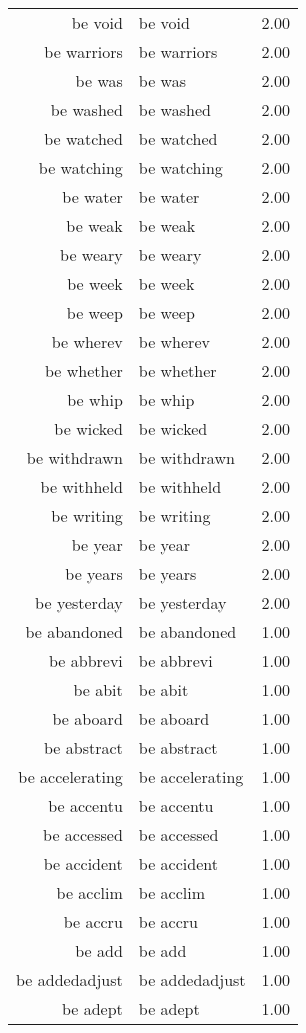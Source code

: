 \begin{table}[ht]
\begin{tabular}{rlr}
  be void & be void & 2.00 \\ 
  be warriors & be warriors & 2.00 \\ 
  be was & be was & 2.00 \\ 
  be washed & be washed & 2.00 \\ 
  be watched & be watched & 2.00 \\ 
  be watching & be watching & 2.00 \\ 
  be water & be water & 2.00 \\ 
  be weak & be weak & 2.00 \\ 
  be weary & be weary & 2.00 \\ 
  be week & be week & 2.00 \\ 
  be weep & be weep & 2.00 \\ 
  be wherev & be wherev & 2.00 \\ 
  be whether & be whether & 2.00 \\ 
  be whip & be whip & 2.00 \\ 
  be wicked & be wicked & 2.00 \\ 
  be withdrawn & be withdrawn & 2.00 \\ 
  be withheld & be withheld & 2.00 \\ 
  be writing & be writing & 2.00 \\ 
  be year & be year & 2.00 \\ 
  be years & be years & 2.00 \\ 
  be yesterday & be yesterday & 2.00 \\ 
  be abandoned & be abandoned & 1.00 \\ 
  be abbrevi & be abbrevi & 1.00 \\ 
  be abit & be abit & 1.00 \\ 
  be aboard & be aboard & 1.00 \\ 
  be abstract & be abstract & 1.00 \\ 
  be accelerating & be accelerating & 1.00 \\ 
  be accentu & be accentu & 1.00 \\ 
  be accessed & be accessed & 1.00 \\ 
  be accident & be accident & 1.00 \\ 
  be acclim & be acclim & 1.00 \\ 
  be accru & be accru & 1.00 \\ 
  be add & be add & 1.00 \\ 
  be addedadjust & be addedadjust & 1.00 \\ 
  be adept & be adept & 1.00 \\ 

\end{tabular}
\end{table}
